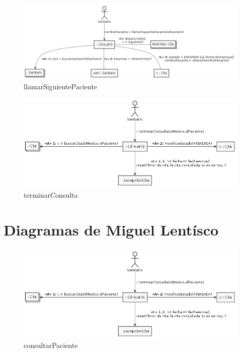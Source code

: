 \documentclass[11pt,a4paper]{article}
\begin{document}
\begin{figure}[H]
	\caption{llamarSiguientePaciente}
	\centering
	\includegraphics[width=\textwidth,height=\textheight,keepaspectratio]{Diagramas/llamarsiguientepaciente}
\end{figure}

\begin{figure}[H]
	\caption{terminarConsulta}
	\centering
	\includegraphics[width=\textwidth,height=\textheight,keepaspectratio]{Diagramas/terminarconsulta}
\end{figure}

\section{Diagramas de Miguel Lentísco}

\begin{figure}[H]
	\caption{consultarPaciente}
	\centering
	\includegraphics[width=\textwidth,height=\textheight,keepaspectratio]{Diagramas/terminarconsulta}
\end{figure}
\end{document}
